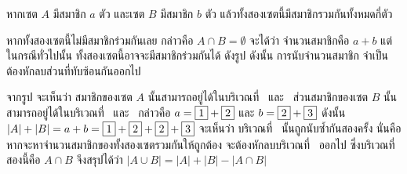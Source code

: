 \documentclass[a4paper,12pt,twoside]{article}
\begin{document}
\begin{example}
หากเซต $A$ มีสมาชิก $a$ ตัว และเซต $B$ มีสมาชิก $b$ ตัว แล้วทั้งสองเซตนี้มีสมาชิกรวมกันทั้งหมดกี่ตัว

หากทั้งสองเซตนี้ไม่มีสมาชิกร่วมกันเลย กล่าวคือ $A\cap B=\emptyset$ จะได้ว่า จำนวนสมาชิกคือ $a+b$ \enskip แต่ในกรณีทั่วไปนั้น ทั้งสองเซตนี้อาจจะมีสมาชิกร่วมกันได้ ดังรูป \enskip ดังนั้น การนับจำนวนสมาชิก จำเป็นต้องหักลบส่วนที่ทับซ้อนกันออกไป
\begin{center}
\end{center}

จากรูป จะเห็นว่า สมาชิกของเซต $A$ นั้นสามารถอยู่ได้ในบริเวณที่~ และ~ ส่วนสมาชิกของเซต $B$ นั้นสามารถอยู่ได้ในบริเวณที่~ และ~ กล่าวคือ $a=\fbox{1}+\fbox{2}$ และ $b=\fbox{2}+\fbox{3}$ \enskip ดังนั้น $|A|+|B|=a+b=\fbox{1}+\fbox{2}+\fbox{2}+\fbox{3}$ \enskip จะเห็นว่า บริเวณที่~ นั้นถูกนับซ้ำกันสองครั้ง นั่นคือ หากจะหาจำนวนสมาชิกของทั้งสองเซตรวมกันให้ถูกต้อง จะต้องหักลบบริเวณที่~ ออกไป ซึ่งบริเวณที่สองนี้คือ $A\cap B$ \enskip จึงสรุปได้ว่า $|A\cup B|=|A|+|B|-|A\cap B|$
\end{example}
\end{document}
